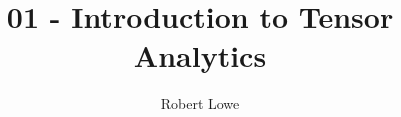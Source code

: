 \documentclass[handout]{beamer}
\title{01 - Introduction to Tensor Analytics}
\author{Robert Lowe}
\institute[Southeast Missouri State University] %
{
  Department of Computer Science\\
  Southeast Missouri State University
}
\date[]{}
\begin{document}
\begin{frame}
  \titlepage
\end{frame}





\end{document}

